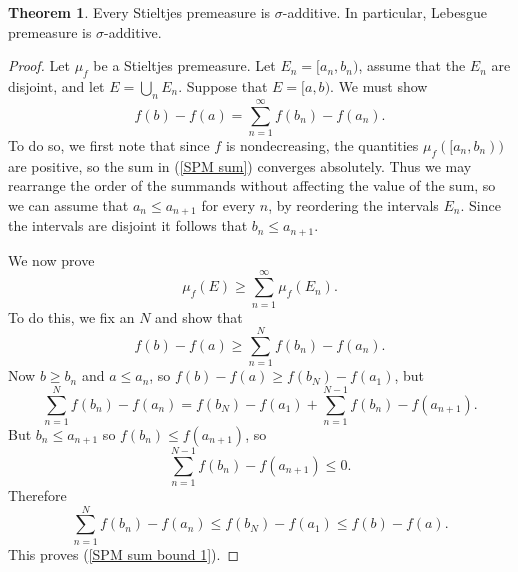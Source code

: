 \documentclass[12pt]{book}
\theoremstyle{definition}
\newtheorem{theorem}{Theorem}[section]
\begin{document}
\begin{theorem}
Every Stieltjes premeasure is $\sigma$-additive.
In particular, Lebesgue premeasure is $\sigma$-additive.
\end{theorem}
\begin{proof}
Let $\mu_f$ be a Stieltjes premeasure.
Let $E_n = [a_n, b_n)$, assume that the $E_n$ are disjoint, and let $E = \bigcup_n E_n$.
Suppose that $E = [a, b)$. We must show
\begin{equation}
\label{SPM sum}
f(b) - f(a) = \sum_{n=1}^\infty f(b_n) - f(a_n).
\end{equation}
To do so, we first note that since $f$ is nondecreasing, the quantities $\mu_f([a_n, b_n))$ are positive, so the sum in (\ref{SPM sum}) converges absolutely.
Thus we may rearrange the order of the summands without affecting the value of the sum, so we can assume that $a_n \leq a_{n+1}$ for every $n$, by reordering the intervals $E_n$.
Since the intervals are disjoint it follows that $b_n \leq a_{n+1}$.

We now prove
$$\mu_f(E) \geq \sum_{n=1}^\infty \mu_f(E_n).$$
To do this, we fix an $N$ and show that
\begin{equation}
\label{SPM sum bound 1}
f(b) - f(a) \geq \sum_{n=1}^N f(b_n) - f(a_n).
\end{equation}
Now $b \geq b_n$ and $a \leq a_n$, so $f(b) - f(a) \geq f(b_N) - f(a_1)$, but
$$\sum_{n=1}^N f(b_n) - f(a_n) = f(b_N) - f(a_1) + \sum_{n=1}^{N-1} f(b_n) - f(a_{n+1}).$$
But $b_n \leq a_{n+1}$ so $f(b_n) \leq f(a_{n+1})$, so
$$\sum_{n=1}^{N-1} f(b_n) - f(a_{n+1}) \leq 0.$$
Therefore
$$\sum_{n=1}^N f(b_n) - f(a_n) \leq f(b_N) - f(a_1) \leq f(b) - f(a).$$
This proves (\ref{SPM sum bound 1}).


\end{proof}
\end{document}
